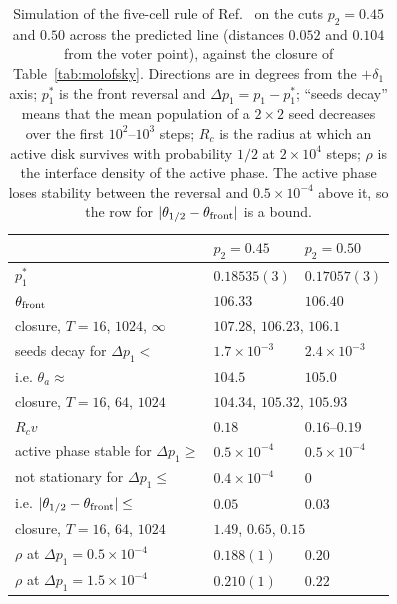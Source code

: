 \documentclass[pre,twocolumn,superscriptaddress,showpacs,floatfix]{revtex4-2}
\begin{document}
\begin{table}
\caption{Simulation of the five-cell rule of Ref.~\cite{molofsky1999} on the cuts $p_2 = 0.45$
and $0.50$ across the predicted line (distances $0.052$ and $0.104$ from the voter point),
against the closure of Table~\ref{tab:molofsky}. Directions are in degrees from the $+\delta_1$
axis; $p_1^*$ is the front reversal and $\Delta p_1 = p_1 - p_1^*$; ``seeds decay'' means that the mean population of a
$2\times2$ seed decreases over the first $10^2$--$10^3$ steps; $R_c$ is the radius at which an
active disk survives with probability $1/2$ at $2\times10^4$ steps; $\rho$ is the interface
density of the active phase. The active phase loses stability between the reversal and
$0.5\times10^{-4}$ above it, so the row for $|\theta_{1/2} - \theta_{\rm front}|$ is a bound.}
\label{tab:molsim}
\begin{ruledtabular}
\begin{tabular}{lll}
 & $p_2 = 0.45$ & $p_2 = 0.50$ \\
\hline
$p_1^*$ & $0.18535(3)$ & $0.17057(3)$ \\
$\theta_{\rm front}$ & $106.33$ & $106.40$ \\
\quad closure, $T = 16$, $1024$, $\infty$ & \multicolumn{2}{l}{$107.28$, $106.23$, $106.1$} \\
seeds decay for $\Delta p_1 <$ & $1.7\times10^{-3}$ & $2.4\times10^{-3}$ \\
\quad i.e. $\theta_a\approx$ & $104.5$ & $105.0$ \\
\quad closure, $T = 16$, $64$, $1024$ & \multicolumn{2}{l}{$104.34$, $105.32$, $105.93$} \\
$R_c v$ & $0.18$ & $0.16$--$0.19$ \\
active phase stable for $\Delta p_1\ge$ & $0.5\times10^{-4}$ & $0.5\times10^{-4}$ \\
\quad not stationary for $\Delta p_1\le$ & $0.4\times10^{-4}$ & $0$ \\
\quad i.e. $|\theta_{1/2} - \theta_{\rm front}|\le$ & $0.05$ & $0.03$ \\
\quad closure, $T = 16$, $64$, $1024$ & \multicolumn{2}{l}{$1.49$, $0.65$, $0.15$} \\
$\rho$ at $\Delta p_1 = 0.5\times10^{-4}$ & $0.188(1)$ & $0.20$ \\
$\rho$ at $\Delta p_1 = 1.5\times10^{-4}$ & $0.210(1)$ & $0.22$ \\
\end{tabular}
\end{ruledtabular}
\end{table}
\end{document}
